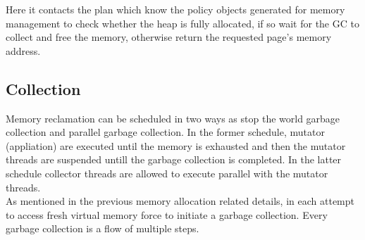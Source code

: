 Here it contacts the plan which know the policy objects generated for memory management to check whether the heap is fully allocated, if so wait for the GC to collect and free the memory, otherwise return the requested page's memory address.\\

\subsection{Collection}
Memory reclamation can be scheduled in two ways as stop the world garbage collection and parallel garbage collection. In the former schedule, mutator (appliation) are executed until the memory is exhausted and then the mutator threads are suspended untill the garbage collection is completed. In the latter schedule collector threads are allowed to execute parallel with the mutator threads.\\

As mentioned in the previous memory allocation related details, in each attempt to access fresh virtual memory force to initiate a garbage collection. Every garbage collection is a flow of multiple steps.  